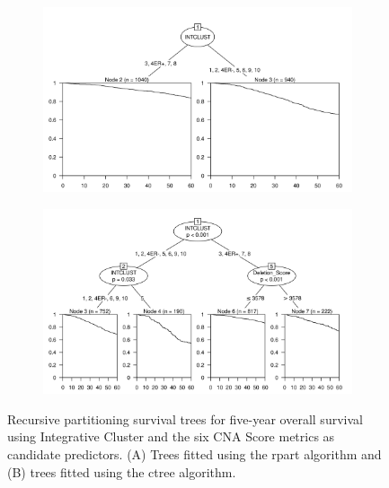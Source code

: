 \begin{figure}[!htb]
\centering

\vspace{0.5cm}

\begin{subfigure}{\textwidth}
\subcaption{}
\includegraphics[width=1\textwidth]{../figures/Appendices/Appendix_B/PartyKit_Survival_Score_FiveYearOS_INTCLUST.png}
\end{subfigure}

\vspace{2cm}

\begin{subfigure}{\textwidth}
\subcaption{}
\includegraphics[width=1\textwidth]{../figures/Appendices/Appendix_B/Ctree_Survival_Score_FiveYearOS_INTCLUST.png}
\end{subfigure}

\vspace{0.5cm}

\caption[Recursive partitioning survival trees for five-year overall survival using Integrative Cluster and the six CNA Score metrics as candidate predictors.]{Recursive partitioning survival trees for five-year overall survival using Integrative Cluster and the six CNA Score metrics as candidate predictors. (A) Trees fitted using the rpart algorithm and (B) trees fitted using the ctree algorithm.}
\end{figure}

